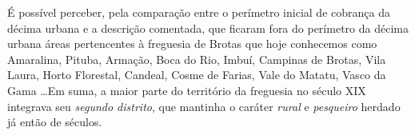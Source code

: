 \begin{enumerate}
\end{enumerate}

É possível perceber, pela comparação entre o perímetro inicial de cobrança da décima urbana e a descrição comentada, que ficaram fora do perímetro da décima urbana áreas pertencentes à freguesia de Brotas que hoje conhecemos como Amaralina, Pituba, Armação, Boca do Rio, Imbuí, Campinas de Brotas, Vila Laura, Horto Florestal, Candeal, Cosme de Farias, Vale do Matatu, Vasco da Gama \dots Em suma, a maior parte do território da freguesia no século XIX integrava seu \textit{segundo distrito}, que mantinha o caráter \textit{rural} e \textit{pesqueiro} herdado já então de séculos.